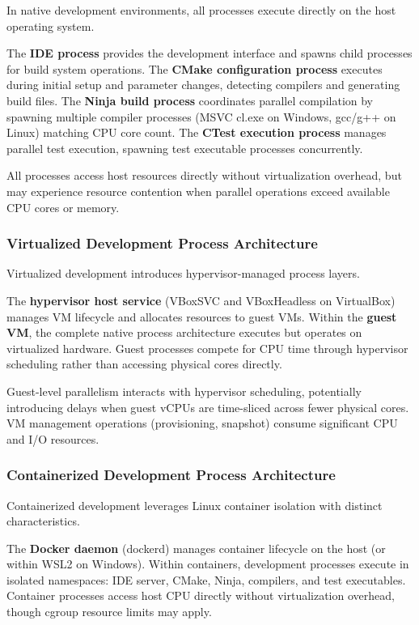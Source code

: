 In native development environments, all processes execute directly on the host operating system.

The \textbf{IDE process} provides the development interface and spawns child processes for build system operations.
The \textbf{CMake configuration process} executes during initial setup and parameter changes, detecting compilers and generating build files.
The \textbf{Ninja build process} coordinates parallel compilation by spawning multiple compiler processes (MSVC cl.exe on Windows, gcc/g++ on Linux) matching CPU core count.
The \textbf{CTest execution process} manages parallel test execution, spawning test executable processes concurrently.

All processes access host resources directly without virtualization overhead, but may experience resource contention when parallel operations exceed available CPU cores or memory.

\subsubsection{Virtualized Development Process Architecture}

Virtualized development introduces hypervisor-managed process layers.

The \textbf{hypervisor host service} (VBoxSVC and VBoxHeadless on VirtualBox) manages VM lifecycle and allocates resources to guest VMs.
Within the \textbf{guest VM}, the complete native process architecture executes but operates on virtualized hardware.
Guest processes compete for CPU time through hypervisor scheduling rather than accessing physical cores directly.

Guest-level parallelism interacts with hypervisor scheduling, potentially introducing delays when guest vCPUs are time-sliced across fewer physical cores.
VM management operations (provisioning, snapshot) consume significant CPU and I/O resources.

\subsubsection{Containerized Development Process Architecture}

Containerized development leverages Linux container isolation with distinct characteristics.

The \textbf{Docker daemon} (dockerd) manages container lifecycle on the host (or within WSL2 on Windows).
Within containers, development processes execute in isolated namespaces: IDE server, CMake, Ninja, compilers, and test executables.
Container processes access host CPU directly without virtualization overhead, though cgroup resource limits may apply.

